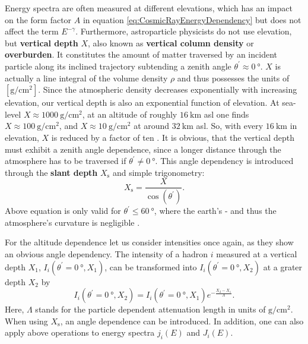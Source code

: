 Energy spectra are often measured at different elevations, which has an impact on the form factor $A$ in equation \ref{eq:CosmicRayEnergyDependency} but does not affect the term $E^{-\gamma}$. Furthermore, astroparticle physicists do not use elevation, but \textbf{vertical depth} $X$, also known as \textbf{vertical column density} or \textbf{overburden}. It constitutes the amount of matter traversed by an incident particle along its inclined trajectory subtending a zenith angle $\theta^\prime \approx \SI{0}{\degree}$. $X$ is actually a line integral of the volume density $\rho$ and thus possesses the units of $[\si{\gram\per\centi\metre\squared}]$. Since the atmospheric density decreases exponentially with increasing elevation, our vertical depth is also an exponential function of elevation. At sea-level $X \approx \SI{1000}{\gram\per\centi\metre\squared}$, at an altitude of roughly $\SI{16}{\kilo\metre}$ \gls{asl} one finds $X \approx \SI{100}{\gram\per\centi\metre\squared}$, and $X \approx \SI{10}{\gram\per\centi\metre\squared}$ at around $\SI{32}{\kilo\metre}$ \gls{asl}. So, with every $\SI{16}{\kilo\metre}$ in elevation, $X$ is reduced by a factor of ten \cite{CosmicRayGrieder}. It is obvious, that the vertical depth must exhibit a zenith angle dependence, since a longer distance through the atmosphere has to be traversed if $\theta^{\prime} \neq \SI{0}{\degree}$. This angle dependency is introduced through the \textbf{slant depth} $X_\text{s}$ and simple trigonometry:
\begin{equation}
    X_\text{s} = \frac{X}{\cos{(\theta^\prime)}}.
\end{equation}
Above equation is only valid for $\theta^\prime \leq \SI{60}{\degree}$, where the earth's - and thus the atmosphere's curvature is negligible \cite{CosmicRayGrieder}.

For the altitude dependence let us consider intensities once again, as they show an obvious angle dependency. The intensity of a hadron $i$ measured at a vertical depth $X_1$, $I_i(\theta^\prime=\SI{0}{\degree}, X_1)$, can be transformed into $I_i(\theta^\prime=\SI{0}{\degree}, X_2)$ at a grater depth $X_2$ by \cite{CosmicRayGrieder}
\begin{equation} \label{eq:AltitudeDependency}
    I_i(\theta^\prime=\SI{0}{\degree}, X_2) = I_i(\theta^\prime=\SI{0}{\degree}, X_1) e^{-\frac{X_2-X_1}{\Lambda}}.
\end{equation}
Here, $\Lambda$ stands for the particle dependent attenuation length in units of $\si{\gram\per\centi\metre\squared}$. When using $X_\text{s}$, an angle dependence can be introduced. In addition, one can also apply above operations to energy spectra $j_i(E)$ and $J_i(E)$.


